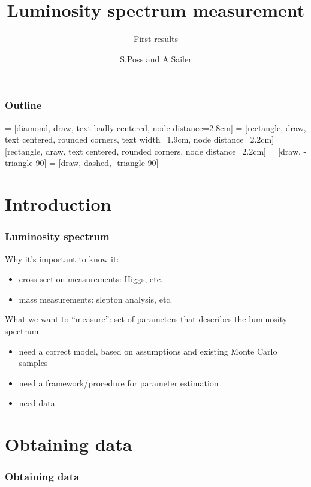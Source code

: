 \documentclass[handout]{beamer}
\author{S.Poss and A.Sailer}
\title{Luminosity spectrum measurement}
\subtitle{First results}
\begin{document}
\begin{frame}
\titlepage
\end{frame}
\begin{frame}
\frametitle{Outline}
\tableofcontents
\end{frame}
 = [diamond, draw, text badly centered, node distance=2.8cm]
 = [rectangle, draw, text centered, rounded corners, text width=1.9cm, node distance=2.2cm]
 = [rectangle, draw, text centered, rounded corners, node distance=2.2cm]
 = [draw, -triangle 90]
 = [draw, dashed, -triangle 90]
\section{Introduction}
\begin{frame}
\frametitle{Luminosity spectrum}
Why it's important to know it:
\begin{itemize}
\item cross section measurements: Higgs, etc.
\item mass measurements: slepton analysis, etc.
\end{itemize}
What we want to ``measure'': set of parameters that describes the luminosity
spectrum.
\begin{itemize}
\item need a correct model, based on assumptions and existing Monte Carlo
samples
\item need a framework/procedure for parameter estimation
\item need data 
\end{itemize}
\end{frame}
\section{Obtaining data}
\begin{frame}
\frametitle{Obtaining data}
\begin{figure}[h]
\end{figure}
\end{frame}
\end{document}
